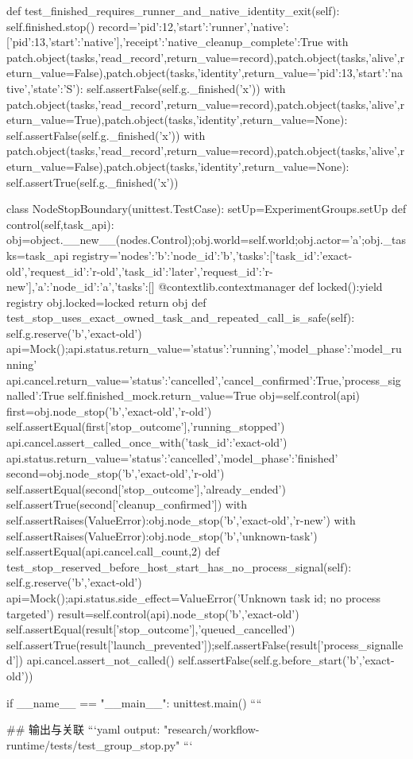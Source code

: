  def test_finished_requires_runner_and_native_identity_exit(self):
   self.finished.stop()
   record={'pid':12,'start':'runner','native':[{'pid':13,'start':'native'}],'receipt':{'native_cleanup_complete':True}}
   with patch.object(tasks,'read_record',return_value=record),patch.object(tasks,'alive',return_value=False),patch.object(tasks,'identity',return_value={'pid':13,'start':'native','state':'S'}):
    self.assertFalse(self.g._finished('x'))
   with patch.object(tasks,'read_record',return_value=record),patch.object(tasks,'alive',return_value=True),patch.object(tasks,'identity',return_value=None):
    self.assertFalse(self.g._finished('x'))
   with patch.object(tasks,'read_record',return_value=record),patch.object(tasks,'alive',return_value=False),patch.object(tasks,'identity',return_value=None):
    self.assertTrue(self.g._finished('x'))

class NodeStopBoundary(unittest.TestCase):
 setUp=ExperimentGroups.setUp
 def control(self,task_api):
  obj=object.__new__(nodes.Control);obj.world=self.world;obj.actor='a';obj._tasks=task_api
  registry={'nodes':{'b':{'node_id':'b','tasks':[{'task_id':'exact-old','request_id':'r-old'},{'task_id':'later','request_id':'r-new'}]},'a':{'node_id':'a','tasks':[]}}}
  @contextlib.contextmanager
  def locked():yield registry
  obj.locked=locked
  return obj
 def test_stop_uses_exact_owned_task_and_repeated_call_is_safe(self):
  self.g.reserve('b','exact-old')
  api=Mock();api.status.return_value={'status':'running','model_phase':'model_running'}
  api.cancel.return_value={'status':'cancelled','cancel_confirmed':True,'process_signalled':True}
  self.finished_mock.return_value=True
  obj=self.control(api)
  first=obj.node_stop('b','exact-old','r-old')
  self.assertEqual(first['stop_outcome'],'running_stopped')
  api.cancel.assert_called_once_with({'task_id':'exact-old'})
  api.status.return_value={'status':'cancelled','model_phase':'finished'}
  second=obj.node_stop('b','exact-old','r-old')
  self.assertEqual(second['stop_outcome'],'already_ended')
  self.assertTrue(second['cleanup_confirmed'])
  with self.assertRaises(ValueError):obj.node_stop('b','exact-old','r-new')
  with self.assertRaises(ValueError):obj.node_stop('b','unknown-task')
  self.assertEqual(api.cancel.call_count,2)
 def test_stop_reserved_before_host_start_has_no_process_signal(self):
  self.g.reserve('b','exact-old')
  api=Mock();api.status.side_effect=ValueError('Unknown task id; no process targeted')
  result=self.control(api).node_stop('b','exact-old')
  self.assertEqual(result['stop_outcome'],'queued_cancelled')
  self.assertTrue(result['launch_prevented']);self.assertFalse(result['process_signalled'])
  api.cancel.assert_not_called()
  self.assertFalse(self.g.before_start('b','exact-old'))

if __name__ == "__main__": unittest.main()
````

## 输出与关联
```yaml
output: "research/workflow-runtime/tests/test_group_stop.py"
```
